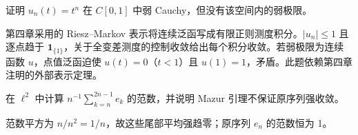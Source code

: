 \begin{exercise}\label{ex:y5-cauchy}
证明 $u_n(t)=t^n$ 在 $C[0,1]$ 中弱 Cauchy，但没有该空间内的弱极限。
\end{exercise}
\begin{solution}
第四章采用的 Riesz--Markov 表示将连续泛函写成有限正则测度积分。$|u_n|\le1$ 且逐点趋于 $\mathbf1_{\{1\}}$，关于全变差测度的控制收敛给出每个积分收敛。若弱极限为连续函数 $u$，点值泛函迫使 $u(t)=0$（$t<1$）且 $u(1)=1$，矛盾。此题依赖第四章注明的外部表示定理。
\end{solution}

\begin{exercise}[凸组合恢复强收敛]\label{ex:y5-averages}
在 $\ell^2$ 中计算 $n^{-1}\sum_{k=n}^{2n-1}e_k$ 的范数，并说明 Mazur 引理不保证原序列强收敛。
\end{exercise}
\begin{solution}
范数平方为 $n/n^2=1/n$，故这些尾部平均强趋零；原序列 $e_n$ 的范数恒为 1。
\end{solution}

